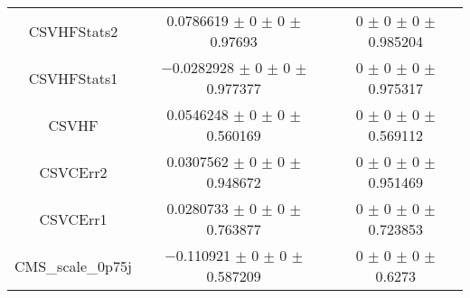 \begin{table}
\begin{tabular}{ccc}
CSVHFStats2 	& \num{0.0786619} $\pm$ \num{0} $\pm$ \num{0} $\pm$ \num{0.97693} 	& \num{0} $\pm$ \num{0} $\pm$ \num{0} $\pm$ \num{0.985204}\\
CSVHFStats1 	& \num{-0.0282928} $\pm$ \num{0} $\pm$ \num{0} $\pm$ \num{0.977377} 	& \num{0} $\pm$ \num{0} $\pm$ \num{0} $\pm$ \num{0.975317}\\
CSVHF 	& \num{0.0546248} $\pm$ \num{0} $\pm$ \num{0} $\pm$ \num{0.560169} 	& \num{0} $\pm$ \num{0} $\pm$ \num{0} $\pm$ \num{0.569112}\\
CSVCErr2 	& \num{0.0307562} $\pm$ \num{0} $\pm$ \num{0} $\pm$ \num{0.948672} 	& \num{0} $\pm$ \num{0} $\pm$ \num{0} $\pm$ \num{0.951469}\\
CSVCErr1 	& \num{0.0280733} $\pm$ \num{0} $\pm$ \num{0} $\pm$ \num{0.763877} 	& \num{0} $\pm$ \num{0} $\pm$ \num{0} $\pm$ \num{0.723853}\\
CMS\_scale\_0p75j 	& \num{-0.110921} $\pm$ \num{0} $\pm$ \num{0} $\pm$ \num{0.587209} 	& \num{0} $\pm$ \num{0} $\pm$ \num{0} $\pm$ \num{0.6273}\\
\bottomrule
\end{tabular}
\end{table}